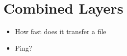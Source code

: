 \section{Combined Layers}

\begin{itemize}
\item How fast does it transfer a file
\item Ping?
\end{itemize}
